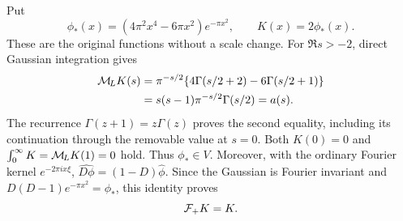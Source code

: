 \documentclass[11pt]{article}
\begin{document}
Put
\begin{equation}\label{mburn:eq:kernel}
 \phi_*(x)=(4\pi^2x^4-6\pi x^2)e^{-\pi x^2},\qquad K(x)=2\phi_*(x).
\end{equation}
These are the original functions without a scale change. For
$\Re s>-2$, direct Gaussian integration gives
\begin{align}
 \mathcal M_{\!L} K(s)
 &=\pi^{-s/2}\{4\Gamma(s/2+2)-6\Gamma(s/2+1)\}\nonumber\\
 &=s(s-1)\pi^{-s/2}\Gamma(s/2)=a(s).\label{mburn:eq:MK}
\end{align}
The recurrence $\Gamma(z+1)=z\Gamma(z)$ proves the second equality,
including its continuation through the removable value at $s=0$.
Both $K(0)=0$ and $\int_0^\infty K=\mathcal M_{\!L} K(1)=0$ hold. Thus
$\phi_*\in V$. Moreover, with the ordinary Fourier kernel
$e^{-2\pi i x\xi}$, $\widehat{D\phi}=(1-D)\widehat\phi$.
Since the Gaussian is Fourier invariant and
$D(D-1)e^{-\pi x^2}=\phi_*$, this identity proves
\begin{equation}\label{mburn:eq:selfdual}
 \mathcal F_+ K=K.
\end{equation}
\end{document}
